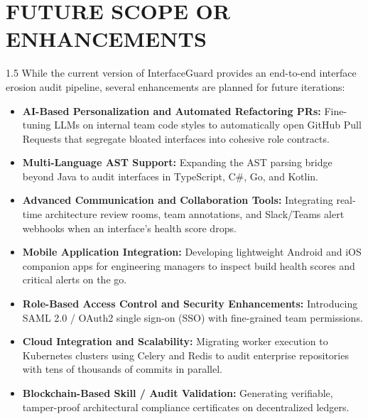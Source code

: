 \documentclass[12pt,a4paper]{article}
\begin{document}
\clearpage

\section{FUTURE SCOPE OR ENHANCEMENTS}

\begin{spacing}{1.5}
\justifying
While the current version of InterfaceGuard provides an end-to-end interface erosion audit pipeline, several enhancements are planned for future iterations:

\begin{itemize}[leftmargin=*,itemsep=3pt]
  \item \textbf{AI-Based Personalization and Automated Refactoring PRs:} Fine-tuning LLMs on internal team code styles to automatically open GitHub Pull Requests that segregate bloated interfaces into cohesive role contracts.
  \item \textbf{Multi-Language AST Support:} Expanding the AST parsing bridge beyond Java to audit interfaces in TypeScript, C\#, Go, and Kotlin.
  \item \textbf{Advanced Communication and Collaboration Tools:} Integrating real-time architecture review rooms, team annotations, and Slack/Teams alert webhooks when an interface's health score drops.
  \item \textbf{Mobile Application Integration:} Developing lightweight Android and iOS companion apps for engineering managers to inspect build health scores and critical alerts on the go.
  \item \textbf{Role-Based Access Control and Security Enhancements:} Introducing SAML 2.0 / OAuth2 single sign-on (SSO) with fine-grained team permissions.
  \item \textbf{Cloud Integration and Scalability:} Migrating worker execution to Kubernetes clusters using Celery and Redis to audit enterprise repositories with tens of thousands of commits in parallel.
  \item \textbf{Blockchain-Based Skill / Audit Validation:} Generating verifiable, tamper-proof architectural compliance certificates on decentralized ledgers.
\end{itemize}
\end{spacing}

\clearpage

\end{document}
